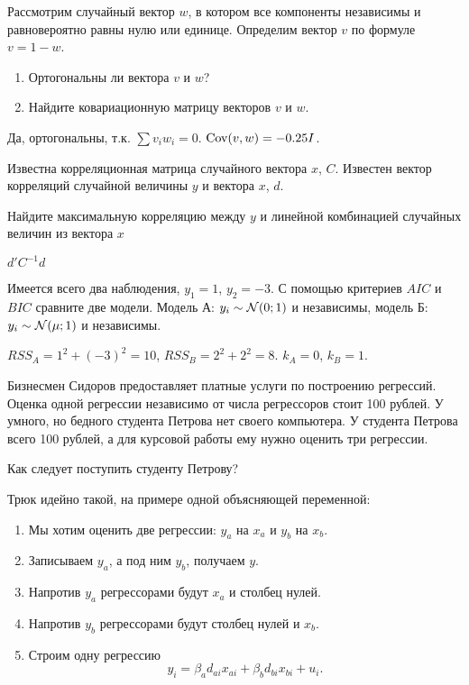 \begin{problem}
Рассмотрим случайный вектор $w$, в котором все компоненты независимы и равновероятно равны нулю или единице. Определим вектор $v$ по формуле $v=1-w$.

\begin{enumerate}
\item Ортогональны ли вектора $v$ и $w$?
\item Найдите ковариационную матрицу векторов $v$ и $w$.
\end{enumerate}
\begin{sol}
Да, ортогональны, т.к. $\sum v_i w_i = 0$. $\operatorname{Cov}(v,w)=-0.25 I$.
\end{sol}
\end{problem}


\begin{problem}
Известна корреляционная матрица случайного вектора $x$, $C$. Известен вектор корреляций случайной величины $y$ и вектора $x$, $d$.

Найдите максимальную корреляцию между $y$ и линейной комбинацией случайных величин из вектора $x$

\begin{sol}
$d'C^{-1}d$
\end{sol}
\end{problem}

\begin{problem}
  Имеется всего два наблюдения, $y_1 = 1$, $y_2 = -3$. С помощью критериев $AIC$ и $BIC$ сравните две модели. Модель А: $y_i \sim \mathcal{N}(0; 1)$ и независимы, модель Б: $y_i \sim \mathcal{N}(\mu; 1)$ и независимы.
\begin{sol}
  $RSS_A = 1^2 + (-3)^2 = 10$, $RSS_B= 2^2 + 2^2 = 8$. $k_A = 0$, $k_B=1$.
\end{sol}
\end{problem}


\begin{problem}
Бизнесмен Сидоров предоставляет платные услуги по построению регрессий. Оценка одной регрессии независимо от числа регрессоров стоит 100 рублей. У умного, но бедного студента Петрова нет своего компьютера. У студента Петрова всего 100 рублей, а для курсовой работы ему нужно оценить три регрессии.

Как следует поступить студенту Петрову?
\begin{sol}
Трюк идейно такой, на примере одной объясняющей переменной:

\begin{enumerate}
\item Мы хотим оценить две регрессии: $y_a$ на $x_a$ и $y_b$ на $x_b$.
\item Записываем $y_a$, а под ним $y_b$, получаем $y$.
\item Напротив $y_a$ регрессорами будут  $x_a$ и столбец нулей.
\item Напротив $y_b$ регрессорами будут столбец нулей и $x_b$.
\item Строим одну регрессию
\[
y_i = \beta_a d_{ai}x_{ai} + \beta_b d_{bi}x_{bi} + u_i.
\]
\end{enumerate}

\end{sol}
\end{problem}



